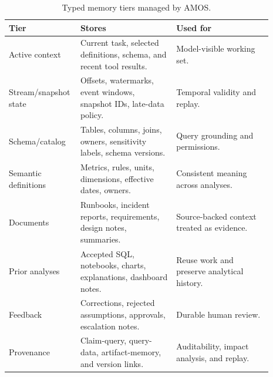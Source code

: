 \documentclass[10pt]{article}
\newcommand{\amos}{\textsc{AMOS}\xspace}
\begin{document}
\begin{table}[p]
\centering
\small
\begin{tabular}{L{0.19\linewidth}L{0.35\linewidth}L{0.35\linewidth}}
\toprule
\textbf{Tier} & \textbf{Stores} & \textbf{Used for} \\
\midrule
Active context & Current task, selected definitions, schema, and recent tool results. & Model-visible working set. \\
Stream/snapshot state & Offsets, watermarks, event windows, snapshot IDs, late-data policy. & Temporal validity and replay. \\
Schema/catalog & Tables, columns, joins, owners, sensitivity labels, schema versions. & Query grounding and permissions. \\
Semantic definitions & Metrics, rules, units, dimensions, effective dates, owners. & Consistent meaning across analyses. \\
Documents & Runbooks, incident reports, requirements, design notes, summaries. & Source-backed context treated as evidence. \\
Prior analyses & Accepted SQL, notebooks, charts, explanations, dashboard notes. & Reuse work and preserve analytical history. \\
Feedback & Corrections, rejected assumptions, approvals, escalation notes. & Durable human review. \\
Provenance & Claim-query, query-data, artifact-memory, and version links. & Auditability, impact analysis, and replay. \\
\bottomrule
\end{tabular}
\caption{Typed memory tiers managed by \amos.}
\label{tab:tiers}
\end{table}
\end{document}
